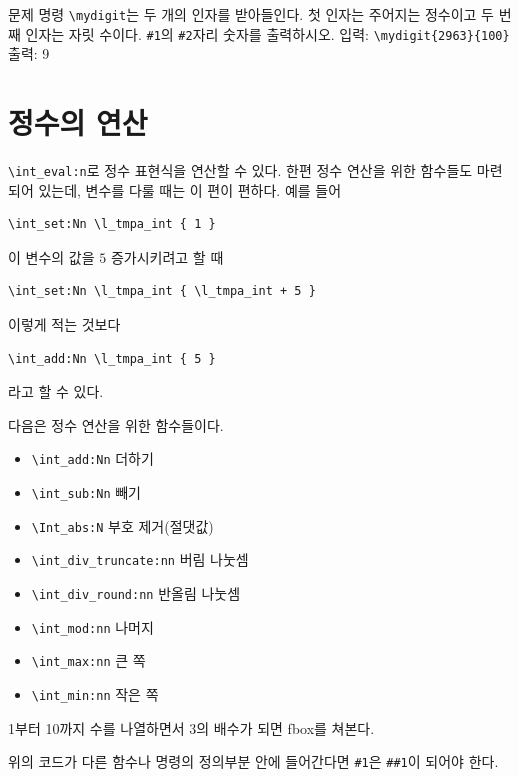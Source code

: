 \documentclass[a4paper,amsmath]{oblivoir}
\newcounter{sub}
\begin{document}
\newpage

\begin{questiona}{문제}
명령 \verb|\mydigit|는 두 개의 인자를 받아들인다. 첫 인자는 주어지는 정수이고 두 번째 인자는 자릿 수이다. \verb|#1|의 \verb|#2|자리 숫자를 출력하시오.
\tcblower
입력: \verb|\mydigit{2963}{100}| \\
출력: 9
\end{questiona}

\section{정수의 연산}

\verb|\int_eval:n|로 정수 표현식을 연산할 수 있다. 한편 정수 연산을 위한 함수들도 마련되어 있는데, 변수를 다룰 때는 이 편이 편하다. 예를 들어
\begin{verbatim}
\int_set:Nn \l_tmpa_int { 1 }
\end{verbatim}
이 변수의 값을 $5$ 증가시키려고 할 때 
\begin{verbatim}
\int_set:Nn \l_tmpa_int { \l_tmpa_int + 5 }
\end{verbatim}
이렇게 적는 것보다
\begin{verbatim}
\int_add:Nn \l_tmpa_int { 5 }
\end{verbatim}
라고 할 수 있다.

다음은 정수 연산을 위한 함수들이다.
\begin{itemize} \tightlist
\item \verb|\int_add:Nn| 더하기
\item \verb|\int_sub:Nn| 빼기
\item \verb|\Int_abs:N| 부호 제거(절댓값)
\item \verb|\int_div_truncate:nn| 버림 나눗셈
\item \verb|\int_div_round:nn| 반올림 나눗셈
\item \verb|\int_mod:nn| 나머지
\item \verb|\int_max:nn| 큰 쪽
\item \verb|\int_min:nn| 작은 쪽
\end{itemize}

1부터 10까지 수를 나열하면서 3의 배수가 되면 fbox를 쳐본다.


위의 코드가 다른 함수나 명령의 정의부분 안에 들어간다면 \verb|#1|은 \verb|##1|이 되어야 한다.
\end{document}
